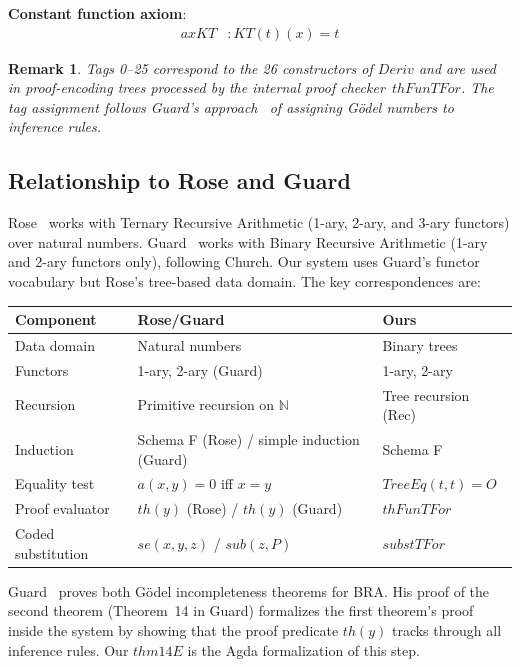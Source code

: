 \documentclass[11pt]{article}
\newtheorem{remark}[theorem]{Remark}
\begin{document}
\noindent\textbf{Constant function axiom}:
\begin{align}
  \mathit{axKT}&: \mathit{KT}(t)(x) = t \tag{tag 25}
\end{align}

\begin{remark}
Tags 0--25 correspond to the 26 constructors of $\mathit{Deriv}$ and are
used in proof-encoding trees processed by the internal proof
checker~$\mathit{thFunTFor}$. The tag assignment follows Guard's
approach~\cite{guard1963} of assigning G\"odel numbers to inference rules.
\end{remark}

\subsection{Relationship to Rose and Guard}

Rose~\cite{rose1961} works with Ternary Recursive Arithmetic (1-ary, 2-ary,
and 3-ary functors) over natural numbers. Guard~\cite{guard1963} works
with Binary Recursive Arithmetic (1-ary and 2-ary functors only), following
Church. Our system uses Guard's functor vocabulary but Rose's tree-based
data domain. The key correspondences are:

\begin{center}
\begin{tabular}{lll}
\hline
\textbf{Component} & \textbf{Rose/Guard} & \textbf{Ours} \\
\hline
Data domain & Natural numbers & Binary trees \\
Functors & 1-ary, 2-ary (Guard) & 1-ary, 2-ary \\
Recursion & Primitive recursion on $\mathbb{N}$ & Tree recursion (Rec) \\
Induction & Schema F (Rose) / simple induction (Guard) & Schema F \\
Equality test & $a(x,y) = 0$ iff $x = y$ & $\mathit{TreeEq}(t,t) = O$ \\
Proof evaluator & $th(y)$ (Rose) / $th(y)$ (Guard) & $\mathit{thFunTFor}$ \\
Coded substitution & $se(x,y,z)$ / $\mathit{sub}(z,P)$ & $\mathit{substTFor}$ \\
\hline
\end{tabular}
\end{center}

Guard~\cite{guard1963} proves both G\"odel incompleteness theorems for BRA.
His proof of the second theorem (Theorem~14 in Guard) formalizes the first
theorem's proof inside the system by showing that the proof predicate
$th(y)$ tracks through all inference rules. Our $\mathit{thm14E}$ is the
Agda formalization of this step.
\end{document}
